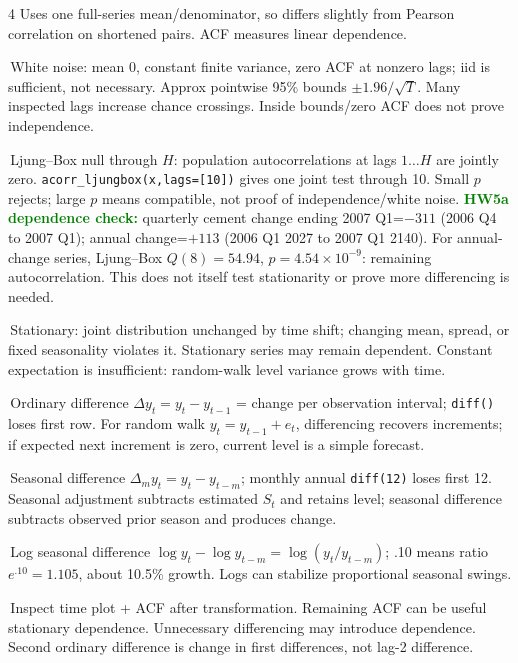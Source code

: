 \documentclass[10pt]{article}
\newcommand{\topic}[1]{\vspace{2.5ex}{\color{blue}\bfseries\fontsize{6.0}{6.1}\selectfont #1}\par\vspace{0.1pt}}
\newcommand{\key}[1]{\textcolor{green}{\textbf{#1}}}
\newcommand{\code}[1]{\texttt{#1}}
\newcommand{\bitem}{\par\vspace{0.8ex}\hangindent=0.09in\hangafter=1\textbullet\,}
\begin{document}
\begin{multicols*}{4}
Uses one full-series mean/denominator, so differs slightly from Pearson correlation on shortened pairs. ACF measures linear dependence.
\bitem White noise: mean 0, constant finite variance, zero ACF at nonzero lags; iid is sufficient, not necessary. Approx pointwise 95\% bounds $\pm1.96/\sqrt T$. Many inspected lags increase chance crossings. Inside bounds/zero ACF does not prove independence.
\bitem Ljung--Box null through $H$: population autocorrelations at lags $1\ldots H$ are jointly zero. \code{acorr\_ljungbox(x,lags=[10])} gives one joint test through 10. Small $p$ rejects; large $p$ means compatible, not proof of independence/white noise.
\key{HW5a dependence check:} quarterly cement change ending 2007 Q1=$-311$ (2006 Q4 to 2007 Q1); annual change=$+113$ (2006 Q1 2027 to 2007 Q1 2140). For annual-change series, Ljung--Box $Q(8)=54.94$, $p=4.54\times10^{-9}$: remaining autocorrelation. This does not itself test stationarity or prove more differencing is needed.

\topic{STATIONARITY + DIFFERENCING}
\bitem Stationary: joint distribution unchanged by time shift; changing mean, spread, or fixed seasonality violates it. Stationary series may remain dependent. Constant expectation is insufficient: random-walk level variance grows with time.
\bitem Ordinary difference $\Delta y_t=y_t-y_{t-1}$ = change per observation interval; \code{diff()} loses first row. For random walk $y_t=y_{t-1}+e_t$, differencing recovers increments; if expected next increment is zero, current level is a simple forecast.
\bitem Seasonal difference $\Delta_m y_t=y_t-y_{t-m}$; monthly annual \code{diff(12)} loses first 12. Seasonal adjustment subtracts estimated $S_t$ and retains level; seasonal difference subtracts observed prior season and produces change.
\bitem Log seasonal difference $\log y_t-\log y_{t-m}=\log(y_t/y_{t-m})$; .10 means ratio $e^{.10}=1.105$, about 10.5\% growth. Logs can stabilize proportional seasonal swings.
\bitem Inspect time plot + ACF after transformation. Remaining ACF can be useful stationary dependence. Unnecessary differencing may introduce dependence. Second ordinary difference is change in first differences, not lag-2 difference.


\end{multicols*}
\end{document}
